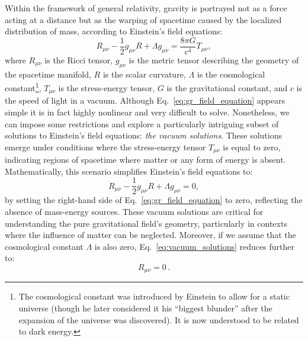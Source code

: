 \documentclass[main.tex]{subfiles}
\begin{document}
    Within the framework of general relativity, gravity is portrayed not as a force acting at a distance but as the warping of spacetime caused by the localized distribution of mass, according to Einstein's field equations:
    \begin{equation}\label{eq:gr_field_equation}
        R_{\mu \nu} - \frac{1}{2}g_{\mu \nu}R + \Lambda g_{\mu \nu} = \frac{8\pi G}{c^4} T_{\mu \nu}, 
    \end{equation}
    where $R_{\mu \nu}$ is the Ricci tensor, $g_{\mu \nu}$ is the metric tensor describing the geometry of the spacetime manifold, $R$ is the scalar curvature, $\Lambda$ is the cosmological constant\footnote{The cosmological constant was introduced by Einstein to allow for a static universe (though he later considered it his ``biggest blunder'' after the expansion of the universe was discovered). It is now understood to be related to dark energy.}, $T_{\mu \nu}$ is the stress-energy tensor, $G$ is the gravitational constant, and $c$ is the speed of light in a vacuum. Although Eq.~\eqref{eq:gr_field_equation} appears simple it is in fact highly nonlinear and very difficult to solve. Nonetheless, we can impose some restrictions and explore a particularly intriguing subset of solutions to Einstein's field equations: \textit{the vacuum solutions}. These solutions emerge under conditions where the stress-energy tensor $T_{\mu \nu}$ is equal to zero, indicating regions of spacetime where matter or any form of energy is absent. Mathematically, this scenario simplifies Einstein's field equations to:
    \begin{equation}\label{eq:vacuum_solutions}
    R_{\mu \nu} - \frac{1}{2}g_{\mu \nu}R + \Lambda g_{\mu \nu} = 0,
    \end{equation}
    by setting the right-hand side of Eq.~\eqref{eq:gr_field_equation} to zero, reflecting the absence of mass-energy sources. These vacuum solutions are critical for understanding the pure gravitational field's geometry, particularly in contexts where the influence of matter can be neglected. Moreover, if we assume that the cosmological constant $\Lambda$ is also zero, Eq.~\eqref{eq:vacuum_solutions} reduces further to:
    \begin{equation}
        R_{\mu \nu} = 0\,.
    \end{equation}
    
\end{document}

